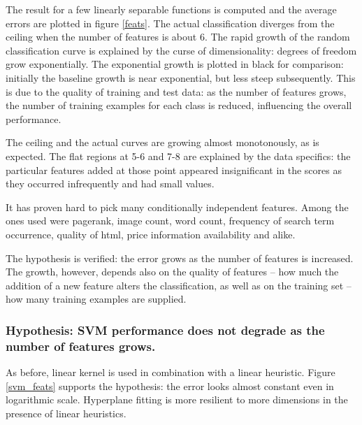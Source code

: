 \documentclass[12pt,notitlepage,twoside]{scrreprt}
\begin{document}
The result for a few linearly separable functions is computed and the average errors are
plotted in figure \ref{feats}. The actual classification diverges from the ceiling when
the number of features is about 6. The rapid growth of the random classification curve is
explained by the curse of dimensionality: degrees of freedom grow exponentially. The
exponential growth is plotted in black for comparison: initially the baseline growth is
near exponential, but less steep subsequently. This is due to the quality of training and
test data: as the number of features grows, the number of training examples for each class
is reduced, influencing the overall performance.

The ceiling and the actual curves are growing almost monotonously, as is expected. The
flat regions at 5-6 and 7-8 are explained by the data specifics: the particular features added at
those point appeared insignificant in the scores as they occurred infrequently and had
small values.


It has proven hard to pick many conditionally independent features. Among the ones used
were pagerank, image count, word count, frequency of search term occurrence, quality of
html, price information availability and alike.

The hypothesis is verified: the error grows as the number of features is increased. The
growth, however, depends also on the quality of features -- how much the addition of a new
feature alters the classification, as well as on the training set -- how many training
examples are supplied.
\subsubsection*{Hypothesis: SVM performance does not degrade as the number of features grows.}

As before, linear kernel is used in combination with a linear heuristic. Figure
\ref{svm_feats} supports the hypothesis: the error looks almost constant even in
logarithmic scale. Hyperplane fitting is more resilient to more dimensions in the presence
of linear heuristics.
\end{document}
